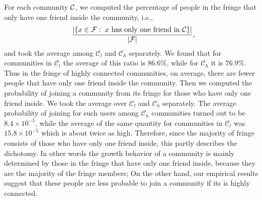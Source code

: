 For each community $\mathcal{C}$, we computed the percentage of people in the fringe that only have one friend inside the community, i.e., 
\[
\frac{|\{x\in\mathcal{F} : \; x \textmd{ has only one friend in } \mathcal{C} \}|}{|\mathcal{F}|},
\]
and took the average among $\mathcal{C}_l$ and $\mathcal{C}_h$ separately. 
We found that for communities in $\mathcal{C}_l$ the average of this ratio is $86.6\%$, while for $\mathcal{C}_h$ it is
$76.9\%$.
Thus in the fringe of highly connected communities, on average, there are fewer people that have only one friend inside the community. Then we computed the probability 
of joining a community from its fringe for those who have only one friend inside. We took the average over $\mathcal{C}_l$ and $\mathcal{C}_h$ separately. 
The average probability of joining for such users among $\mathcal{C}_h$ communities turned out to be $8.4\times10^{-5}$, while the average of the same 
quantity for communities in $\mathcal{C}_l$ was $15.8\times 10^{-5}$ which is about twice as high. Therefore, since the majority of fringe consists of those who have only one friend inside, this partly describes the dichotomy. In other words the growth behavior  of a community is mainly determined by those in the fringe that have only one friend inside, because they are the majority of the fringe members; On the other hand, our empirical results suggest that these people are less probable to join a community if its is highly connected. 





%
%
